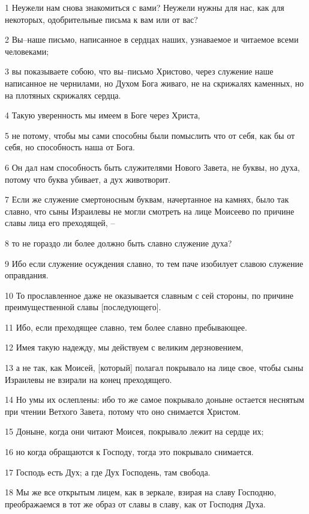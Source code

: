 \par 1 Неужели нам снова знакомиться с вами? Неужели нужны для нас, как для некоторых, одобрительные письма к вам или от вас?
\par 2 Вы--наше письмо, написанное в сердцах наших, узнаваемое и читаемое всеми человеками;
\par 3 вы показываете собою, что вы--письмо Христово, через служение наше написанное не чернилами, но Духом Бога живаго, не на скрижалях каменных, но на плотяных скрижалях сердца.
\par 4 Такую уверенность мы имеем в Боге через Христа,
\par 5 не потому, чтобы мы сами способны были помыслить что от себя, как бы от себя, но способность наша от Бога.
\par 6 Он дал нам способность быть служителями Нового Завета, не буквы, но духа, потому что буква убивает, а дух животворит.
\par 7 Если же служение смертоносным буквам, начертанное на камнях, было так славно, что сыны Израилевы не могли смотреть на лице Моисеево по причине славы лица его преходящей, --
\par 8 то не гораздо ли более должно быть славно служение духа?
\par 9 Ибо если служение осуждения славно, то тем паче изобилует славою служение оправдания.
\par 10 То прославленное даже не оказывается славным с сей стороны, по причине преимущественной славы [последующего].
\par 11 Ибо, если преходящее славно, тем более славно пребывающее.
\par 12 Имея такую надежду, мы действуем с великим дерзновением,
\par 13 а не так, как Моисей, [который] полагал покрывало на лице свое, чтобы сыны Израилевы не взирали на конец преходящего.
\par 14 Но умы их ослеплены: ибо то же самое покрывало доныне остается неснятым при чтении Ветхого Завета, потому что оно снимается Христом.
\par 15 Доныне, когда они читают Моисея, покрывало лежит на сердце их;
\par 16 но когда обращаются к Господу, тогда это покрывало снимается.
\par 17 Господь есть Дух; а где Дух Господень, там свобода.
\par 18 Мы же все открытым лицем, как в зеркале, взирая на славу Господню, преображаемся в тот же образ от славы в славу, как от Господня Духа.

